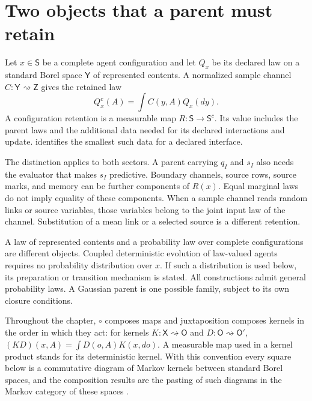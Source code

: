 \section{Two objects that a parent must retain}

Let $x\in\mathsf S$ be a complete agent configuration and let $Q_x$ be its
declared law on a standard Borel space $\mathsf Y$ of represented contents. A
normalized sample channel $C:\mathsf Y\rightsquigarrow\mathsf Z$ gives the
retained law
\begin{equation}
 Q_x^c(A)=\int C(y,A)Q_x(dy).
 \label{inh:sample-parent}
\end{equation}
A configuration retention is a measurable map
$R:\mathsf S\to\mathsf S^c$. Its value includes the parent laws and the
additional data needed for its declared interactions and update.
 identifies the smallest such data for a declared
interface.

The distinction applies to both sectors. A parent carrying $q_I$ and $s_I$
also needs the evaluator that makes $s_I$ predictive. Boundary channels,
source rows, source marks, and memory can be further components of $R(x)$.
Equal marginal laws do not imply equality of these components. When a sample
channel reads random links or source variables, those variables belong to the
joint input law of the channel. Substitution of a mean link or a selected
source is a different retention.

A law of represented contents and a probability law over complete
configurations are different objects. Coupled deterministic evolution of
law-valued agents requires no probability distribution over $x$. If such a
distribution is used below, its preparation or transition mechanism is stated.
All constructions admit general probability laws. A Gaussian parent is one
possible family, subject to its own closure conditions.

Throughout the chapter, $\circ$ composes maps and juxtaposition composes
kernels in the order in which they act: for kernels
$K:\mathsf X\rightsquigarrow\mathsf O$ and
$D:\mathsf O\rightsquigarrow\mathsf O'$,
$(KD)(x,A)=\int D(o,A)K(x,do)$. A measurable map used in a kernel product
stands for its deterministic kernel. With this convention every square below
is a commutative diagram of Markov kernels between standard Borel spaces, and
the composition results are the pasting of such diagrams in the Markov
category of these spaces \citep{Fritz2020}.

